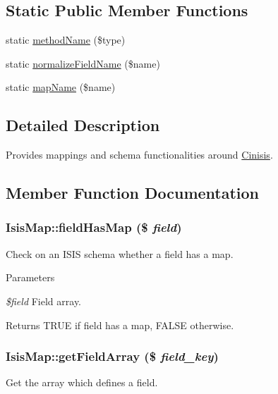 \subsection*{Static Public Member Functions}
\begin{DoxyCompactItemize}
\item 
static \hyperlink{classIsisMap_af80aedabfeca623a9022dfcbc95d591c}{methodName} (\$type)
\item 
static \hyperlink{classIsisMap_ae2abf0591a4862f537fa23537ffca705}{normalizeFieldName} (\$name)
\item 
static \hyperlink{classIsisMap_a7f1b9b1cce7a02dea704a40ca85e2117}{mapName} (\$name)
\end{DoxyCompactItemize}


\subsection{Detailed Description}
Provides mappings and schema functionalities around \hyperlink{classCinisis}{Cinisis}. 

\subsection{Member Function Documentation}
\hypertarget{classIsisMap_af94e1fc5d73a6272f04a60c0acaeb409}{
\subsubsection[{fieldHasMap}]{\setlength{\rightskip}{0pt plus 5cm}IsisMap::fieldHasMap (\$ {\em field})}}
\label{classIsisMap_af94e1fc5d73a6272f04a60c0acaeb409}
Check on an ISIS schema whether a field has a map.


\begin{DoxyParams}{Parameters}
\item[{\em \$field}]Field array.\end{DoxyParams}
\begin{DoxyReturn}{Returns}
TRUE if field has a map, FALSE otherwise. 
\end{DoxyReturn}
\hypertarget{classIsisMap_aee1953b6e46b1612c725b2da82414d14}{
\subsubsection[{getFieldArray}]{\setlength{\rightskip}{0pt plus 5cm}IsisMap::getFieldArray (\$ {\em field\_\-key})}}
\label{classIsisMap_aee1953b6e46b1612c725b2da82414d14}
Get the array which defines a field.


